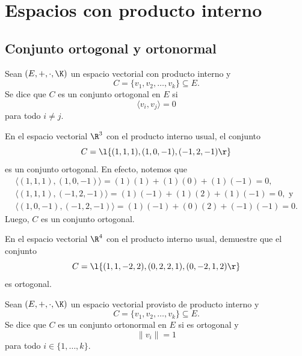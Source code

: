 \documentclass[compacto,10pt]{pubciencias-notas}
\begin{document}
\setcounter{section}{4}
\section{Espacios con producto interno}
\subsection{Conjunto ortogonal y ortonormal}


\begin{defi}
    Sean $(E,+,\cdot,\K)$ un espacio vectorial con producto interno  y
    \[C=\{v_1, v_2, \ldots, v_k\}\subseteq E.\] Se dice que $C$ es un conjunto ortogonal en $E$ si
    \[
        \langle  v_i, v_j \rangle  = 0
    \]
    para todo $i \neq j$.
\end{defi}

\begin{ejem}\hspace{0pt}\label{Sem08:EjemConjOrt} En el espacio vectorial $\R^{3}$ con el producto interno usual, el conjunto 
\[
    C = \l\{(1,1,1), (1,0,-1), (-1,2,-1)\r\}
\]
es un conjunto ortogonal. En efecto, notemos que
\[
\begin{array}{l}
    \langle (1,1,1), (1,0,-1)\rangle  = (1)(1) + (1)(0) + (1)(-1) = 0,\\
    \langle (1,1,1), (-1,2,-1)\rangle  = (1)(-1) + (1)(2) + (1)(-1) = 0,\text{ y}\\
    \langle (1,0,-1), (-1,2,-1)\rangle  = (1)(-1) + (0)(2) + (-1)(-1) = 0.
\end{array}
\]
Luego, $C$ es un conjunto ortogonal.
\end{ejem}

\begin{ejer}\hspace{0pt} En el espacio vectorial $\R^{4}$ con el producto interno usual, demuestre que el conjunto 
\[
    C = \l\{(1,1,-2,2), (0,2,2,1), (0,-2,1,2)\r\}
\]
es ortogonal.
\end{ejer}

\begin{defi}
Sean $(E,+,\cdot,\K)$ un espacio vectorial provisto de producto interno y
\[C = \{v_1, v_2, \ldots, v_k\} \subseteq E.\] Se dice que $C$ es un conjunto ortonormal en $E$ si es ortogonal y 
\[
    \| v_i\| =  1
\]
para todo $i \in \{1, \ldots, k\}$.
\end{defi}
\end{document}
